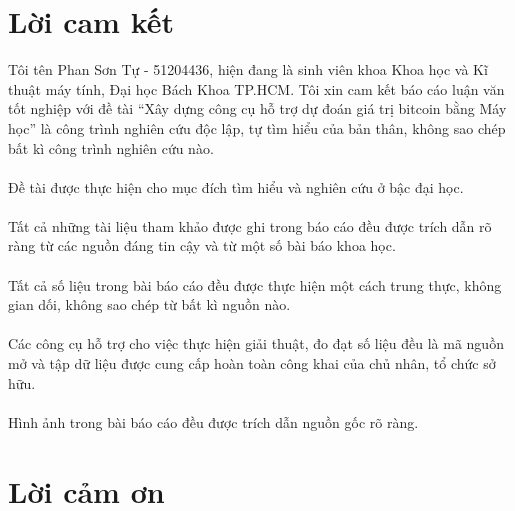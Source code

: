 \section*{Lời cam kết}
\thispagestyle{plain} 
Tôi tên Phan Sơn Tự - 51204436, hiện đang là sinh viên khoa Khoa học và Kĩ thuật 
máy tính, Đại học Bách Khoa TP.HCM. Tôi xin cam kết báo cáo luận văn tốt nghiệp với đề tài 
``Xây dựng công cụ hỗ trợ dự đoán giá trị bitcoin bằng Máy học'' là công trình nghiên cứu độc lập, 
tự tìm hiểu của bản thân, không sao chép bất kì công trình nghiên cứu nào.\\\\
Đề tài được thực hiện
cho mục đích tìm hiểu và nghiên cứu ở bậc đại học.\\\\
Tất cả những tài liệu tham khảo được ghi trong báo cáo đều được trích dẫn rõ
ràng từ các nguồn đáng tin cậy và từ một số bài báo khoa học.\\\\
Tất cả số liệu trong bài báo cáo đều được thực hiện một cách trung thực,
không gian dối, không sao chép từ bất kì nguồn nào.\\\\
Các công cụ hỗ trợ cho việc thực hiện giải thuật, đo đạt số liệu đều là mã nguồn mở và tập
dữ liệu được cung cấp hoàn toàn công khai của chủ nhân, tổ chức sở hữu.\\\\
Hình ảnh trong bài báo cáo đều được trích dẫn nguồn gốc rõ ràng.
\pagebreak

\section*{Lời cảm ơn}
\thispagestyle{plain} 

